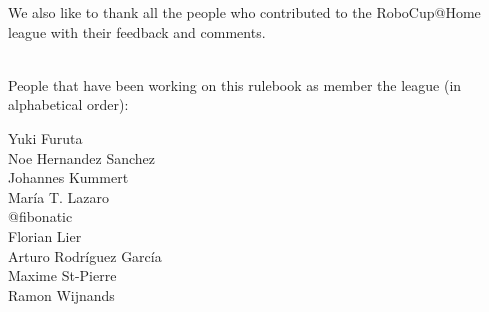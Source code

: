 We also like to thank all the people who contributed to the RoboCup@Home league with their feedback and comments. 

~\\\noindent People that have been working on this rulebook as member the league (in alphabetical order):
\begin{multicols}{3}%
\noindent%
Yuki Furuta\\%
Noe Hernandez Sanchez\\%
\columnbreak%
Johannes Kummert\\%
Mar{\'i}a T. Lazaro\\%
@fibonatic\\%
\columnbreak%
Florian Lier\\%
Arturo Rodr{\'i}guez Garc{\'i}a\\%
Maxime St-Pierre\\%
Ramon Wijnands\\%
\end{multicols}

